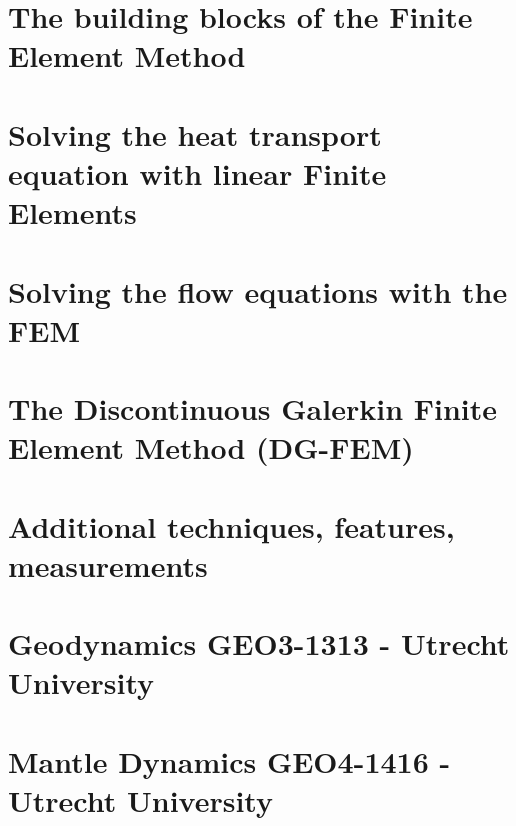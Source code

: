 \documentclass[a4paper]{article}
\numberwithin{equation}{section}
\begin{document}
\section{The building blocks of the Finite Element Method} %


\newpage 
\section{Solving the heat transport equation with linear Finite Elements \label{chapt5}} %


\newpage 
\section{Solving the flow equations with the FEM} \label{solvingFEM} %


\newpage
\section{The Discontinuous Galerkin Finite Element Method (DG-FEM) \label{dgfem}} %


\newpage
\section{Additional techniques, features, measurements} %


\newpage
\section{Geodynamics GEO3-1313 - Utrecht University} %


\newpage
\section{Mantle Dynamics GEO4-1416 - Utrecht University} %

\end{document}
